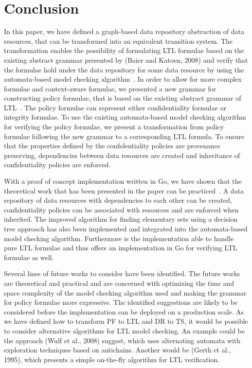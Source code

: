 \section{Conclusion}
In this paper, we have defined a graph-based data repository abstraction of data resources, that can be transformed into an equivalent transition system. The transformation enables the possibility of formulating LTL formulae based on the existing abstract grammar presented by (Baier and Katoen, 2008)\cite{baier2008principles} and verify that the formulae hold under the data repository for some data resource by using the automata-based model checking algorithm~\cite{baier2008principles}. In order to allow for more complex formulae and context-aware formulae, we presented a new grammar for constructing policy formulae, that is based on the existing abstract grammar of LTL~\cite{baier2008principles}. The policy formulae can represent either confidentiality formulae or integrity formulae. To use the existing automata-based model checking algorithm for verifying the policy formulae, we present a transformation from policy formulae following the new grammar to a corresponding LTL formula. To ensure that the properties defined by the confidentiality policies are provenance preserving, dependencies between data resources are created and inheritance of confidentiality policies are enforced.

With a proof of concept implementation written in Go, we have shown that the theoretical work that has been presented in the paper can be practiced~\cite{}. A data repository of data resources with dependencies to each other can be created, confidentiality policies can be associated with resources and are enforced when inherited. The improved algorithm for finding elementary sets using a decision tree approach has also been implemented and integrated into the automata-based model checking algorithm. Furthermore is the implementation able to handle pure LTL formulae and thus offers an implementation in Go for verifying LTL formulae as well.

Several lines of future works to consider have been identified. The future works are theoretical and practical and are concerned with optimizing the time and space complexity of the model checking algorithm used and making the grammar for policy formulae more expressive. The identified suggestions are likely to be considered before the implementation can be deployed on a production scale. As we have defined how to transform PF to LTL and DR to TS, it would be possible to consider alternative algorithms for LTL model checking. An example could be the approach (Wulf et al., 2008)\cite{de2008antichains} suggest, which uses alternating automata with exploration techniques based on antichains. Another would be (Gerth et al., 1995)\cite{gerth1995simple}, which presents a simple on-the-fly algorithm for LTL verification.
